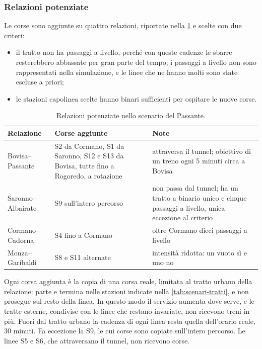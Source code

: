 \subsubsection{Relazioni potenziate}
Le corse sono aggiunte su quattro relazioni, riportate nella \cref{tab:scenari-relazioni} e scelte con due criteri:
\begin{itemize}
	\item il tratto non ha passaggi a livello, perché con queste cadenze le sbarre resterebbero abbassate per gran parte del tempo; i passaggi a livello non sono rappresentati nella simulazione, e le linee che ne hanno molti sono state escluse a priori;
	\item le stazioni capolinea scelte hanno binari sufficienti per ospitare le nuove corse.
\end{itemize}

\begin{table}[H]
	\centering
	\caption{Relazioni potenziate nello scenario del Passante.}
	\label{tab:scenari-relazioni}
	\begin{tabularx}{\textwidth}{>{\raggedright\arraybackslash}p{}>{\raggedright\arraybackslash}p{}X}
		\toprule
		Relazione & Corse aggiunte & Note \\
		\midrule
		Bovisa--Passante & S2 da Cormano, S1 da Saronno, S12 e S13 da Bovisa, tutte fino a Rogoredo, a rotazione & attraversa il tunnel; obiettivo di un treno ogni 5 minuti circa a Bovisa \\
		Saronno--Albairate & S9 sull'intero percorso & non passa dal tunnel; ha un tratto a binario unico e cinque passaggi a livello, unica eccezione al criterio \\
		Cormano--Cadorna & S4 fino a Cormano & oltre Cormano dieci passaggi a livello \\
		Monza--Garibaldi & S8 e S11 alternate & intensità ridotta: un vuoto sì e uno no \\
		\bottomrule
	\end{tabularx}
\end{table}

Ogni corsa aggiunta è la copia di una corsa reale, limitata al tratto urbano della relazione: parte e termina nelle stazioni indicate nella \cref{tab:scenari-tratti}, e non prosegue sul resto della linea. In questo modo il servizio aumenta dove serve, e le tratte esterne, condivise con le linee che restano invariate, non ricevono treni in più. Fuori dal tratto urbano la cadenza di ogni linea resta quella dell'orario reale, 30 minuti. Fa eccezione la S9, le cui corse sono copiate sull'intero percorso. Le linee S5 e S6, che attraversano il tunnel, non ricevono corse.

